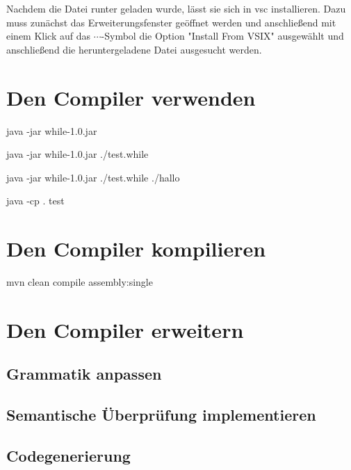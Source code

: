 Nachdem die Datei runter geladen wurde, lässt sie sich in \ac{vsc} installieren. Dazu muss zunächst das Erweiterungsfenster geöffnet werden und anschließend mit einem Klick auf das $\cdots$-Symbol die Option "Install From VSIX" ausgewählt und anschließend die heruntergeladene Datei ausgesucht werden. 


\section{Den Compiler verwenden}
java -jar while-1.0.jar


java -jar while-1.0.jar ./test.while


java -jar while-1.0.jar ./test.while ./hallo

java -cp . test

\section{Den Compiler kompilieren}
mvn clean compile assembly:single

\section{Den Compiler erweitern} 
\subsection{Grammatik anpassen}

\subsection{Semantische Überprüfung implementieren}

\subsection{Codegenerierung}